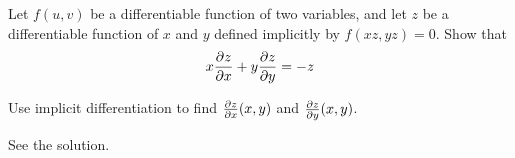 \begin{question}[M200 2014D] %
Let $f(u,v)$ be a differentiable function of two variables, and let $z$ 
be a differentiable function of $x$ and $y$ defined implicitly by 
$f(xz,yz) = 0$. Show that
\begin{equation*}
x\pdiff{z}{x}+y\pdiff{z}{y} = -z
\end{equation*}
\end{question}

\begin{hint}
Use implicit differentiation to find $\pdiff{z}{x}(x,y)$ and 
$\pdiff{z}{y}(x,y)$.
\end{hint}

\begin{answer}
See the solution.
\end{answer}


